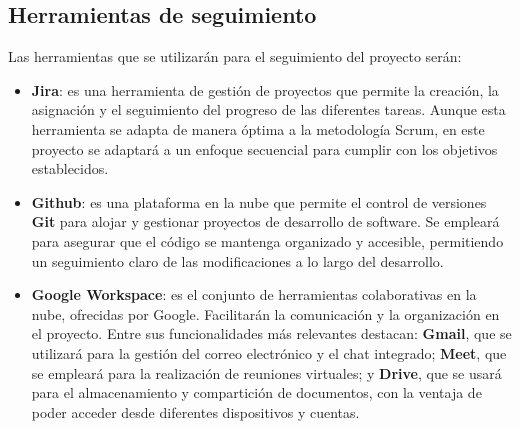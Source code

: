 \subsection{Herramientas de seguimiento}

Las herramientas que se utilizarán para el seguimiento del proyecto serán:
\begin{itemize}
    \item \textbf{Jira}: es una herramienta de gestión de proyectos que permite la creación, la asignación y el seguimiento 
    del progreso de las diferentes tareas. Aunque esta herramienta se adapta de manera óptima a la metodología Scrum, en 
    este proyecto se adaptará a un enfoque secuencial para cumplir con los objetivos establecidos.
    \item \textbf{Github}: es una plataforma en la nube que permite el control de versiones \textbf{Git} para alojar y gestionar 
    proyectos de desarrollo de software. Se empleará para asegurar que el código se mantenga organizado y accesible, permitiendo 
    un seguimiento claro de las modificaciones a lo largo del desarrollo.
    \item \textbf{Google Workspace}: es el conjunto de herramientas colaborativas en la nube, ofrecidas por Google. Facilitarán 
    la comunicación y la organización en el proyecto. Entre sus funcionalidades más relevantes destacan: \textbf{Gmail}, que se 
    utilizará para la gestión del correo electrónico y el chat integrado; \textbf{Meet}, que se empleará para la realización de 
    reuniones virtuales; y \textbf{Drive}, que se usará para el almacenamiento y compartición de documentos, con la ventaja de 
    poder acceder desde diferentes dispositivos y cuentas.
\end{itemize}
